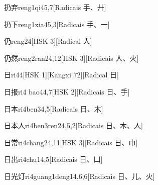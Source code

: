 \begin{entry}{扔弃}{reng1qi4}{5,7}[Radicais ⼿、⼶]
\end{entry}

\begin{entry}{扔下}{reng1xia4}{5,3}[Radicais ⼿、⼀]
\end{entry}

\begin{entry}{仍}{reng2}{4}[HSK 3][Radical ⼈]
\end{entry}

\begin{entry}{仍然}{reng2ran2}{4,12}[HSK 3][Radicais ⼈、⽕]
\end{entry}

\begin{entry}{日}{ri4}{4}[HSK 1][Kangxi 72][Radical ⽇]
\end{entry}

\begin{entry}{日报}{ri4 bao4}{4,7}[HSK 2][Radicais ⽇、⼿]
\end{entry}

\begin{entry}{日本}{ri4ben3}{4,5}[Radicais ⽇、⽊]
\end{entry}

\begin{entry}{日本人}{ri4ben3ren2}{4,5,2}[Radicais ⽇、⽊、⼈]
\end{entry}

\begin{entry}{日常}{ri4chang2}{4,11}[HSK 3][Radicais ⽇、⼱]
\end{entry}

\begin{entry}{日出}{ri4chu1}{4,5}[Radicais ⽇、⼐]
\end{entry}

\begin{entry}{日光灯}{ri4guang1deng1}{4,6,6}[Radicais ⽇、⼉、⽕]
\end{entry}

